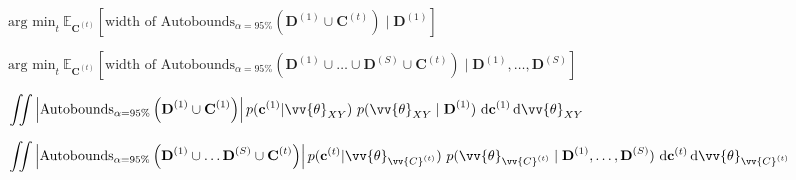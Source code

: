 \documentclass[multi=page, border={1mm 1mm 1mm 1mm}]{standalone}
\newcommand{\aC}{\vv{C}}
\newcommand{\bC}{\textbf{C}}
\newcommand{\bc}{\textbf{c}}
\newcommand{\bD}{\textbf{D}}
\newcommand{\atheta}{\vv{\theta}}
\newcommand{\E}{\mathbb{E}}
\renewcommand{\l}{\left}
\renewcommand{\r}{\right}
\begin{document}
\begin{page}
  $\text{arg min}_t\  \E_{\bC^{(t)}}\l[ \text{width of } \text{Autobounds}_{\alpha=95\%}\l(\bD^{(1)} \cup \bC^{(t)}\r) \mid \bD^{(1)} \r]$
\end{page}

\begin{page}
  $\text{arg min}_t\  \E_{\bC^{(t)}}\l[ \text{width of } \text{Autobounds}_{\alpha=95\%}\l(\bD^{(1)} \cup \ldots \cup \bD^{(S)} \cup \bC^{(t)}\r) \mid \bD^{(1)}, \ldots, \bD^{(S)} \r]$
\end{page}


\begin{page}
  $\displaystyle\iint  \l| \text{Autobounds}_{\alpha=95\%}\l(\bD^{(1)} \cup \bC^{(1)}\r) \r| p(\bc^{(1)} | \atheta_{XY})\ p(\atheta_{XY} \mid \bD^{(1)})\ \dd \bc^{(1)} \dd \atheta_{XY}$
\end{page}

\begin{page}
  $\displaystyle\iint  \l| \text{Autobounds}_{\alpha=95\%}\l(\bD^{(1)} \cup \ldots \bD^{(S)} \cup \bC^{(t)}\r) \r| p(\bc^{(t)} | \atheta_{\aC^{(t)}})\ p(\atheta_{\aC^{(t)}} \mid \bD^{(1)}, \ldots, \bD^{(S)})\ \dd \bc^{(t)} \dd \atheta_{\aC^{(t)}}$
\end{page}
\end{document}
